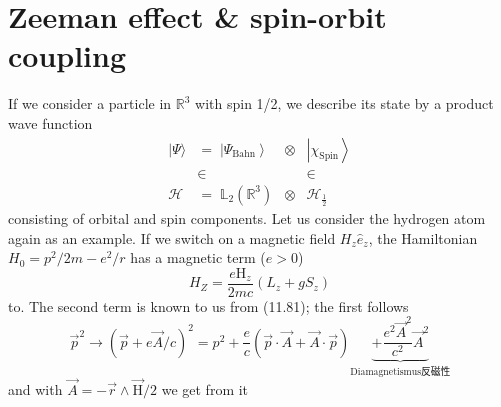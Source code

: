 \section{Zeeman effect \& spin-orbit coupling}
If we consider a particle in $\mathbb{R}^3$ with spin 1/2, we describe its state by a product wave function
\begin{equation}
\begin{array}{ccccc}|\Psi\rangle &=\;\left|\Psi_{\mathrm{Bahn}}\right\rangle & \otimes &\left|\chi_{\mathrm{Spin}}\right\rangle \\  & \in & &\in \\ \mathcal{H} &=\;\mathbb{L}_{2}\left(\mathbb{R}^{3}\right) & \otimes &\mathcal{H}_{\frac{1}{2}} \end{array}
\end{equation}
consisting of orbital and spin components. Let us consider the hydrogen atom again as an example. If we switch on a magnetic field $H_z\hat{e}_z$, the Hamiltonian $H_{0}=p^{2} / 2 m-e^{2} / r$ has a magnetic term ($e> 0$)
\begin{equation}
    H_{Z}=\frac{e \mathrm{H}_{z}}{2 m c}\left(L_{z}+g S_{z}\right)
    \end{equation}
to. The second term is known to us from (11.81); the first follows
\begin{equation}
    \vec{p}^{2} \rightarrow(\vec{p}+e \vec{A} / c)^{2}=p^{2}+\frac{e}{c}(\vec{p} \cdot \vec{A}+\vec{A} \cdot \vec{p}) \underbrace{+\frac{e^{2} \vec{A}^{2}}{c^{2}} \vec{A}^{2}}_{\text {Diamagnetismus反磁性}}
    \end{equation}
and with $\vec{A}=-\vec{r} \wedge \overrightarrow{\mathrm{H}} / 2$ we get from it

